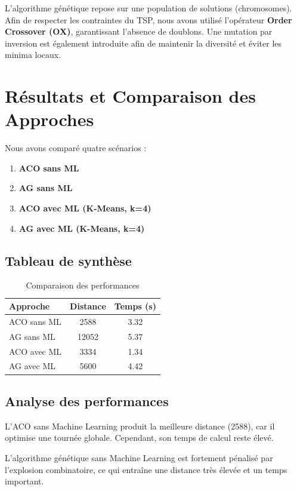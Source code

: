 \documentclass[a4paper, 12pt, twoside]{report}
\begin{document}
L’algorithme génétique repose sur une population de solutions (chromosomes).
Afin de respecter les contraintes du TSP, nous avons utilisé l’opérateur \textbf{Order Crossover (OX)}, garantissant l’absence de doublons.
Une mutation par inversion est également introduite afin de maintenir la diversité et éviter les minima locaux.

\section{Résultats et Comparaison des Approches}

Nous avons comparé quatre scénarios :

\begin{enumerate}
    \item \textbf{ACO sans ML}
    \item \textbf{AG sans ML}
    \item \textbf{ACO avec ML (K-Means, k=4)}
    \item \textbf{AG avec ML (K-Means, k=4)}
\end{enumerate}

\subsection{Tableau de synthèse}

\begin{table}[H]
\centering
\begin{tabular}{|l|c|c|}
\hline
Approche & Distance & Temps (s) \\
\hline
ACO sans ML & 2588 & 3.32 \\
AG sans ML & 12052 & 5.37 \\
ACO avec ML & 3334 & 1.34 \\
AG avec ML & 5600 & 4.42 \\
\hline
\end{tabular}
\caption{Comparaison des performances}
\end{table}

\subsection{Analyse des performances}

L’ACO sans Machine Learning produit la meilleure distance (2588), car il optimise une tournée globale. Cependant, son temps de calcul reste élevé.

L’algorithme génétique sans Machine Learning est fortement pénalisé par l’explosion combinatoire, ce qui entraîne une distance très élevée et un temps important.
\end{document}
